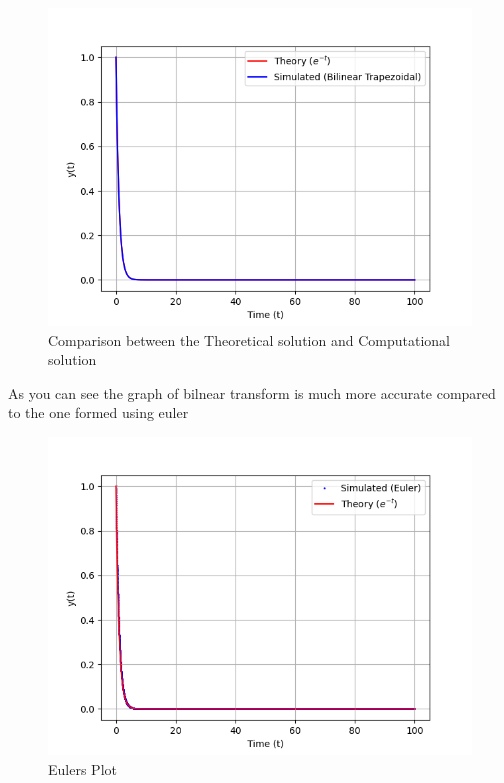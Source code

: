 \documentclass{beamer}
\theoremstyle{remark}
\numberwithin{equation}{section}
\begin{document}
\begin{frame}
\begin{figure}[H]
   \centering
   \includegraphics[width=1\linewidth]{../../assignments/Problem 3/figs/fig.png}
   \caption{Comparison between the Theoretical solution and Computational solution}
   \label{stemplot}
\end{figure}
\end{frame}
\begin{frame}
As you can see the graph of bilnear transform is much more accurate compared to the one formed using euler
\begin{figure}[H]
   \centering
   \includegraphics[width=1\linewidth]{../../assignments/Problem 1/figs/fig.png}
   \caption{Eulers Plot}
   \label{stemplot}
\end{figure}
\end{frame}
\end{document}
